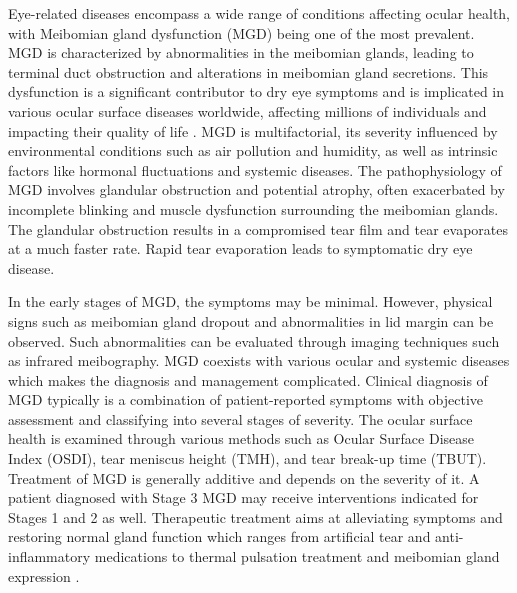 \documentclass{article}
\begin{document}
Eye-related diseases encompass a wide range of conditions affecting ocular health, with Meibomian gland dysfunction (MGD) being one of the most prevalent. MGD is characterized by abnormalities in the meibomian glands, leading to terminal duct obstruction and alterations in meibomian gland secretions. This dysfunction is a significant contributor to dry eye symptoms and is implicated in various ocular surface diseases worldwide, affecting millions of individuals and impacting their quality of life \cite{meiboworkshop}. MGD is multifactorial, its severity influenced by environmental conditions such as air pollution and humidity, as well as intrinsic factors like hormonal fluctuations and systemic diseases. The pathophysiology of MGD involves glandular obstruction and potential atrophy, often exacerbated by incomplete blinking and muscle dysfunction surrounding the meibomian glands. The glandular obstruction results in a compromised tear film and tear evaporates at a much faster rate. Rapid tear evaporation leads to symptomatic dry eye disease.

In the early stages of MGD, the symptoms may be minimal. However, physical signs such as meibomian gland dropout and abnormalities in lid margin can be observed. Such abnormalities can be evaluated through imaging techniques such as infrared meibography. MGD coexists with various ocular and systemic diseases which makes the diagnosis and management complicated. Clinical diagnosis of MGD typically is a combination of patient-reported symptoms with objective assessment and classifying into several stages of severity. The ocular surface health is examined through various methods such as Ocular Surface Disease Index (OSDI), tear meniscus height (TMH), and tear break-up time (TBUT). Treatment of MGD is generally additive and depends on the severity of it. A patient diagnosed with Stage 3 MGD may receive interventions indicated for Stages 1 and 2 as well. Therapeutic treatment aims at alleviating symptoms and restoring normal gland function which ranges from artificial tear and anti-inflammatory medications to thermal pulsation treatment and meibomian gland expression \cite{geerling2011management}.
\end{document}
